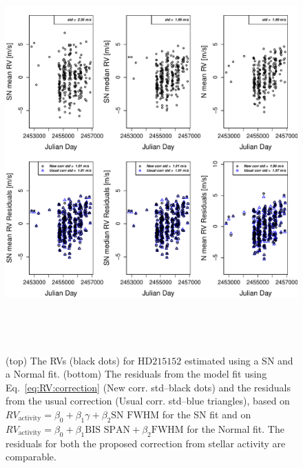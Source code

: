 \documentclass{aa}
\begin{document}
\begin{figure} 
\begin{center}
\includegraphics[height = 6in]{NEW_CORRECTIONHD21515_[3]CorrectionActivity_RadialVelocity_vs_time.pdf} 
   \caption{(top) The RVs (black dots) for $\text{HD}215152$ estimated using a SN and a Normal fit.
 (bottom) The residuals from the model fit using Eq.~\eqref{eq:RV:correction} (New corr. std--black dots) and the residuals from the usual correction (Usual corr. std--blue triangles), based on $RV_{\text{activity}}=\beta_0+\beta_1 \gamma + \beta_2 \text{SN FWHM}$ for the SN fit and on $RV_{\text{activity}}=\beta_0+\beta_1 \text{BIS SPAN} + \beta_2 \text{FWHM}$ for the Normal fit. The residuals for both the proposed correction from stellar activity are comparable.}
   \label{fig:HD215152:correctionRV}
\end{center}
\end{figure}
\end{document}
